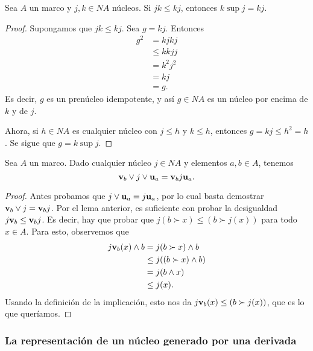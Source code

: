 \begin{lemma}
  Sea $A$ un marco y $j,k\in NA$ núcleos.
  Si $jk\leq kj$, entonces $k\sup j = kj$.
\end{lemma}
\begin{proof}
  Supongamos que $jk\leq kj$.
  Sea $g=kj$.
  Entonces
  \begin{align*}
    g^2
    &= kjkj \\
    &\leq kkjj \\
    &= k^2j^2 \\
    &= kj \\
    &= g.
  \end{align*}
  Es decir, $g$ es un prenúcleo idempotente, y así $g\in NA$
  es un núcleo por encima de $k$ y de $j$.

  Ahora, si $h\in NA$ es cualquier núcleo con $j\leq h$ y $k\leq
  h$, entonces $g=kj\leq h^2=h$.
  Se sigue que $g=k\sup j$.
\end{proof}

\begin{lemma}
    \label{lem:sup-ab-cerr}
  Sea $A$ un marco.
  Dado cualquier núcleo $j\in NA$ y elementos $a,b\in A$, tenemos
  \[
    \mathbf v_{b} \vee j \vee \mathbf u_{a} = \mathbf v_{b} j \mathbf u_{a}
  .\]
\end{lemma}
\begin{proof}
    Antes probamos que $j\vee\mathbf u_{a} = j\mathbf u_{a}$,
    por lo cual basta demostrar $\mathbf v_{b} \vee j = \mathbf v_{b} j$.
  Por el lema anterior, es suficiente con probar la desigualdad
  $j\mathbf v_{b} \leq \mathbf v_{b} j$.
  Es decir, hay que probar que $j(b\succ x) \leq (b\succ j(x))$
  para todo $x\in A$.
  Para esto, observemos que
  \begin{align*}
    j\mathbf v_{b} (x) \wedge b
    &= j(b\succ x) \wedge b \\
    &\leq j((b\succ x)\wedge b) \\
    &= j(b\wedge x) \\
    &\leq j(x).
  \end{align*}
  Usando la definición de la implicación, esto nos da $j\mathbf v_{b}(x) \leq (b\succ j(x))$, que es lo que queríamos.
\end{proof}


\subsubsection{La representación de un núcleo generado por una derivada}

